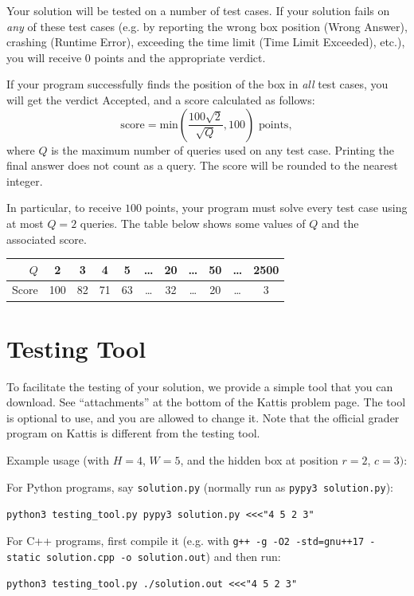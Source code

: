 Your solution will be tested on a number of test cases. If your solution fails on \emph{any} of these test cases (e.g. by reporting the wrong box position (Wrong Answer), crashing (Runtime Error), exceeding the time limit (Time Limit Exceeded), etc.), you will receive 0 points and the appropriate verdict.

If your program successfully finds the position of the box in \emph{all} test cases, you will get the verdict Accepted, and a score calculated as follows:
\[\text{score} = \mathrm{min}\left(\frac{100\sqrt{2}}{\sqrt{Q}}, 100\right)\text{ points},\]
where $Q$ is the maximum number of queries used on any test case. Printing the final answer does not count as a query. The score will be rounded to the nearest integer.

In particular, to receive $100$ points, your program must solve every test case using at most $Q=2$ queries. The table below shows some values of $Q$ and the associated score.

\begin{center}
\begin{tabular}{r|cccccccccc}
  $Q$ & 2 & 3 & 4 & 5 & \ldots & 20 & \ldots & 50 & \ldots & 2500\\ \hline
  Score & 100 & 82 & 71 & 63 & \ldots & 32 & \ldots & 20 & \ldots & 3 \\
\end{tabular}
\end{center}

\section*{Testing Tool}
To facilitate the testing of your solution, we provide a simple tool that you can download.
See ``attachments'' at the bottom of the Kattis problem page.
The tool is optional to use, and you are allowed to change it. Note that the official grader program on Kattis is different from the testing tool.

Example usage (with $H=4$, $W=5$, and the hidden box at position $r=2$, $c=3)$:

For Python programs, say \verb|solution.py| (normally run as \verb|pypy3 solution.py|):

    \verb|python3 testing_tool.py pypy3 solution.py <<<"4 5 2 3"|

For C++ programs, first compile it
(e.g. with \verb|g++ -g -O2 -std=gnu++17 -static solution.cpp -o solution.out|)
and then run:

    \verb|python3 testing_tool.py ./solution.out <<<"4 5 2 3"|

